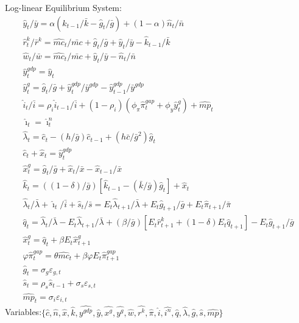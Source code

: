 \documentclass[12pt, final]{article}
\begin{document}
\setcounter{equation}{0}
\noindent Log-linear Equilibrium System:
\begin{gather}
  \hat{y}_t/\bar{y} = \alpha(\hat{k}_{t-1}/\bar{k} - \hat{g}_t/\bar{g}) + (1-\alpha)\hat{n}_t/\bar{n}\\
\hat{r}^k_t/\bar{r}^k = \hat{mc}_t/\bar{mc} + \hat{g}_t/\bar{g} + \hat{y}_t/\bar{y} - \hat{k}_{t-1}/\bar{k}\\
\hat{w}_t/\bar{w} = \hat{mc}_t/\bar{mc} + \hat{y}_t/\bar{y} - \hat{n}_t/\bar{n}\\
\hat{y}_t^{gdp} = \hat{y}_t\\
\hat{y}^g_t = \hat{g}_t/\bar{g} + \hat{y}^{gdp}_t/\bar{y}^{gdp} - \hat{y}^{gdp}_{t-1}/\bar{y}^{gdp}\\
  \hat{i}_t/\bar{i} = \rho_i\hat{i}_{t-1}/\bar{i} + (1-\rho_i)(\phi_\pi\hat{\pi}^{gap}_t+ \phi_y\hat{y}^g_t)+\hat{mp}_t \\
  \hat{\imath}_t = \hat{\imath}_t^n\\
  \hat{\lambda}_t = \hat{c}_t - (h/\bar{g})\hat{c}_{t-1} + (h\bar{c}/\bar{g}^2)\hat{g}_t\\
  \hat{c}_t + \hat{x}_t = \hat{y}^{gdp}_t\\
  \hat{x}^g_t = \hat{g}_t/\bar{g} + \hat{x}_t/\bar{x} - \hat{x}_{t-1}/\bar{x}\\
  \hat{k}_t = ((1-\delta)/\bar{g})[\hat{k}_{t-1}-(\bar{k}/\bar{g})\hat{g}_t] + \hat{x}_t\\
  \hat{\lambda}_t/\bar{\lambda} + \hat{\imath}_t/\bar{i} + \hat{s}_t/\bar{s}  = E_t\hat{\lambda}_{t+1}/\bar{\lambda}+E_t\hat{g}_{t+1}/\bar{g}+E_t\hat{\pi}_{t+1}/\bar{\pi} \\
  \hat{q}_t = \hat{\lambda}_t/\bar{\lambda} - E_t\hat{\lambda}_{t+1}/\bar{\lambda} + (\beta/\bar{g})[E_t\hat{r}^k_{t+1} + (1-\delta)E_t\hat{q}_{t+1}] - E_t\hat{g}_{t+1}/\bar{g}\\
  \hat{x}^g_t = \hat{q}_t + \beta E_t\hat{x}^g_{t+1}\\
  \varphi\hat{\pi}^{gap}_t = \theta\hat{mc}_t+\beta\varphi E_t\hat{\pi}^{gap}_{t+1}\\
  \hat{g}_t = \sigma_g\varepsilon_{g,t}\\
  \hat{s}_t = \rho_s\hat{s}_{t-1} + \sigma_s\varepsilon_{s,t}\\
  \hat{mp}_t = \sigma_i\varepsilon_{i,t}
\end{gather}
Variables:$\{\hat{c},\hat{n},\hat{x},\hat{k},\hat{y^{gdp}},\hat{y},\hat{x^g},\hat{y^g},\hat{w},\hat{r^k},\hat{\pi},\hat{i},\hat{i^n},\hat{q},\hat{\lambda},\hat{g},\hat{s},\hat{mp}\}$\\
\end{document}
